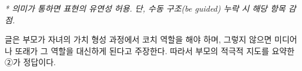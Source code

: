 \documentclass[11pt,a4paper]{article}
\begin{document}
\vspace{4pt}
{\small\itshape
* 의미가 통하면 표현의 유연성 허용. 단, 수동 구조(be guided) 누락 시 해당 항목 감점.}

\vspace{8pt}
\par 글은 부모가 자녀의 가치 형성 과정에서 코치 역할을 해야 하며, 그렇지 않으면 미디어나 또래가 그 역할을 대신하게 된다고 주장한다. 따라서 부모의 적극적 지도를 요약한 ②가 정답이다.
\end{document}
